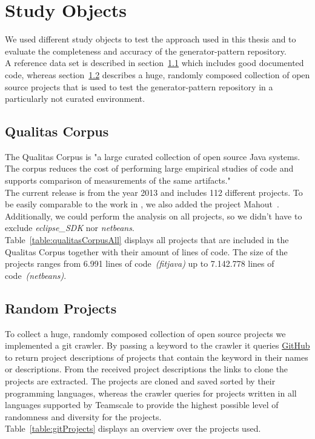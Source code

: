 \section{Study Objects}
We used different study objects to test the approach used in this thesis and to evaluate the completeness and accuracy of the generator-pattern repository. \\
A reference data set is described in section~\ref{section:qualitasCorpus} which includes good documented code, whereas section~\ref{section:randomGitProjects} describes a huge, randomly composed collection of open source projects that is used to test the generator-pattern repository in a particularly not curated environment.
 
\subsection{Qualitas Corpus}
\label{section:qualitasCorpus}
The Qualitas Corpus is "a large curated collection of open source Java systems. The corpus reduces the cost of performing
large empirical studies of code and supports comparison of measurements of the same artifacts."\cite[p.~1]{TemperoEwanandAnslowCraigandDietrichJensandHanTedandLiJingandLumpeMarkusandMeltonHaydenandNoble2010a}\\
The current release is from the year 2013 and includes 112 different projects. To be easily comparable to the work in \cite{Bernwieser2014}, we also added the project Mahout~\cite{ApacheSoftwareFoundation}.\\
Additionally, we could perform the analysis on all projects, so we didn't have to exclude \textit{eclipse\_SDK} nor \textit{netbeans}.\\
Table~\ref{table:qualitasCorpusAll} displays all projects that are included in the Qualitas Corpus together with their amount of lines of code. The size of the projects ranges from 6.991 lines of code~\textit{(fitjava)} up to 7.142.778 lines of code~\textit{(netbeans)}.

\subsection{Random Projects}
\label{section:randomGitProjects}
To collect a huge, randomly composed collection of open source projects we implemented a git crawler.
By passing a keyword to the crawler it queries \href{github.com}{GitHub} to return project descriptions of projects that contain the keyword in their names or descriptions. From the received project descriptions the links to clone the projects are extracted. The projects are cloned and saved sorted by their programming languages, whereas the crawler queries for projects written in all languages supported by Teamscale to provide the highest possible level of randomness and diversity for the projects.\\
Table~\ref{table:gitProjects} displays an overview over the projects used.


\cleardoublepage{}


